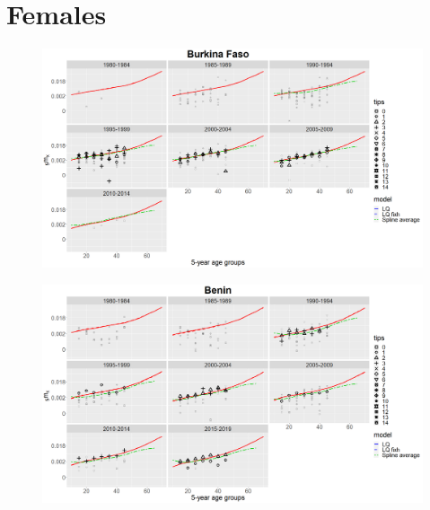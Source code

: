 \documentclass[12pt,a4paper]{article}
\begin{document}
\section*{\centering Females}
\begin{figure}[H]
\includegraphics[width = \linewidth]{Burkina Faso/8/burkina faso females.png}
\end{figure}
\begin{figure}[H]
\includegraphics[width = \linewidth]{Burkina Faso/8/benin females.png}
\end{figure}

\newpage
\end{document}
